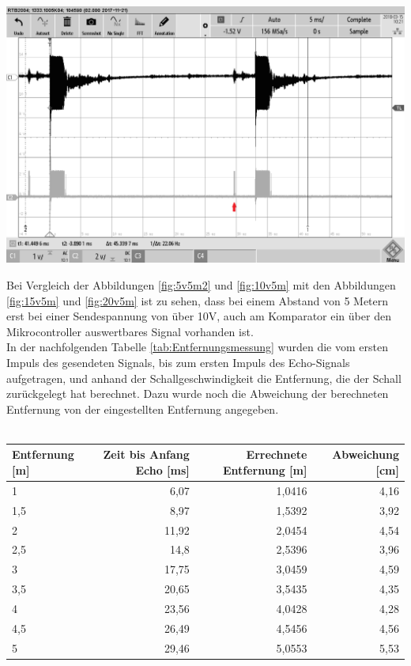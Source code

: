 \begin{minipage}{0.5\textwidth}
\includegraphics[width=1\textwidth%
]{Abbildungen/MessungenP2/20V/5mb.PNG}
\label{fig:20v5m}
\end{minipage}
Bei Vergleich der Abbildungen \ref{fig:5v5m2} und \ref{fig:10v5m} mit den Abbildungen \ref{fig:15v5m} und \ref{fig:20v5m}  ist zu sehen, dass bei einem Abstand von 5 Metern erst bei einer Sendespannung von über 10V, auch am Komparator ein über den Mikrocontroller auswertbares Signal vorhanden ist. \\
In der nachfolgenden Tabelle \ref{tab:Entfernungsmessung} wurden die vom ersten Impuls des gesendeten Signals, bis zum ersten Impuls des Echo-Signals aufgetragen, und anhand der Schallgeschwindigkeit die Entfernung, die der Schall zurückgelegt hat berechnet. Dazu wurde noch die Abweichung der berechneten Entfernung von der eingestellten Entfernung angegeben.\\
\\
\begin{minipage}{1\textwidth}
\begin{tabularx}{\textwidth}{p{}|r|r|r}
Entfernung [m]& Zeit bis Anfang Echo [ms]  & Errechnete Entfernung [m] & Abweichung [cm]\\
\hline
1 & 6,07 & 1,0416 & 4,16\\
1,5 & 8,97 & 1,5392 & 3,92\\
2 & 11,92 & 2,0454 & 4,54\\
2,5 & 14,8 & 2,5396 & 3,96\\
3 & 17,75 & 3,0459 & 4,59\\
3,5 & 20,65 & 3,5435 & 4,35\\
4 & 23,56 & 4,0428 & 4,28\\
4,5 & 26,49 & 4,5456 & 4,56\\
5 & 29,46 & 5,0553 & 5,53\\
\end{tabularx}
\label{tab:Entfernungsmessung}
\end{minipage}\\
